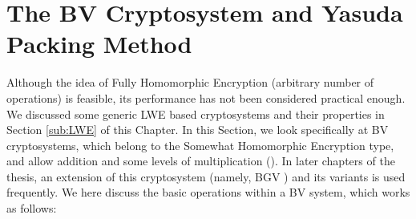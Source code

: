 \section{The BV Cryptosystem and Yasuda Packing Method}
\label{sec:firstProcBGV}
Although the idea of Fully Homomorphic Encryption (arbitrary number of
operations) is feasible, its performance has not been considered practical
enough. We discussed some generic LWE based cryptosystems and their properties in
Section \ref{sub:LWE} of this Chapter. In this Section, we look specifically at BV
cryptosystems, which belong to the Somewhat Homomorphic Encryption type,  and allow
addition and some levels of multiplication (\cite{brakerski2011fully}). In later
chapters of the thesis, an extension of this cryptosystem (namely, BGV
\cite{brakerski2014leveled}) and its variants is used frequently. We here discuss
the basic operations within a BV system, which works
as follows:
